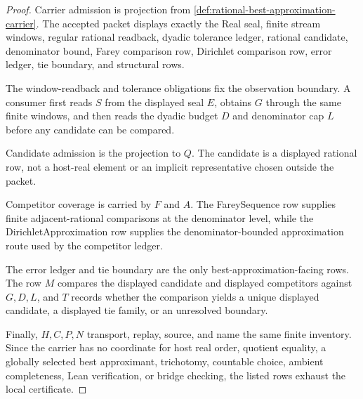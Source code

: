 \begin{proof}
Carrier admission is projection from \autoref{def:rational-best-approximation-carrier}. The accepted packet displays exactly the Real seal, finite stream windows, regular rational readback, dyadic tolerance ledger, rational candidate, denominator bound, Farey comparison row, Dirichlet comparison row, error ledger, tie boundary, and structural rows.

The window-readback and tolerance obligations fix the observation boundary. A consumer first reads $S$ from the displayed seal $E$, obtains $G$ through the same finite windows, and then reads the dyadic budget $D$ and denominator cap $L$ before any candidate can be compared.

Candidate admission is the projection to $Q$. The candidate is a displayed rational row, not a host-real element or an implicit representative chosen outside the packet.

Competitor coverage is carried by $F$ and $A$. The FareySequence row supplies finite adjacent-rational comparisons at the denominator level, while the DirichletApproximation row supplies the denominator-bounded approximation route used by the competitor ledger.

The error ledger and tie boundary are the only best-approximation-facing rows. The row $M$ compares the displayed candidate and displayed competitors against $G,D,L$, and $T$ records whether the comparison yields a unique displayed candidate, a displayed tie family, or an unresolved boundary.

Finally, $H,C,P,N$ transport, replay, source, and name the same finite inventory. Since the carrier has no coordinate for host real order, quotient equality, a globally selected best approximant, trichotomy, countable choice, ambient completeness, Lean verification, or bridge checking, the listed rows exhaust the local certificate.
\end{proof}

